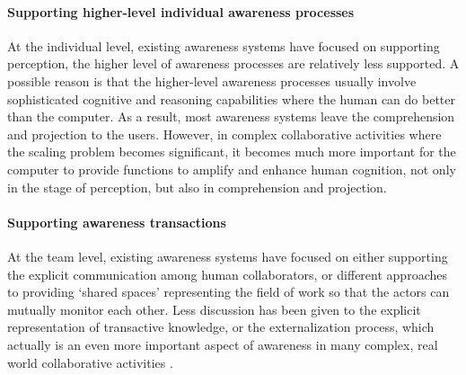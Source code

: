 \paragraph*{Supporting higher-level individual awareness processes} %
\label{par:supporting_for_higher_level_individual_awareness_processes}
At the individual level, existing awareness systems have focused on supporting perception, the higher level of awareness processes are relatively less supported. A possible reason is that the higher-level awareness processes usually involve sophisticated cognitive and reasoning capabilities where the human can do better than the computer. As a result, most awareness systems leave the comprehension and projection to the users. However, in complex collaborative activities where the scaling problem becomes significant, it becomes much more important for the computer to provide functions to amplify and enhance human cognition, not only in the stage of perception, but also in comprehension and projection.

\paragraph*{Supporting awareness transactions} %
\label{par:supporting_for_awareness_transactions}
At the team level, existing awareness systems have focused on either supporting the explicit communication among human collaborators, or different approaches to providing `shared spaces' representing the field of work so that the actors can mutually monitor each other. Less discussion has been given to the explicit representation of transactive knowledge, or the externalization process, which actually is an even more important aspect of awareness in many complex, real world collaborative activities \cite{heath2002a}.



 

